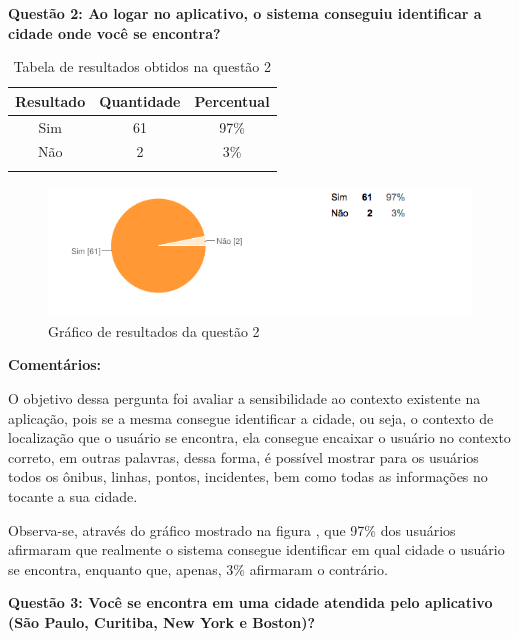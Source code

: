 \textbf{Questão 2: Ao logar no aplicativo, o sistema conseguiu identificar a cidade onde você se encontra?}

\begin{center}
\begin{longtable}{c|c|c}
\hline
    \multicolumn{1}{c}{\textbf{Resultado}} & \multicolumn{1}{c}{\textbf{Quantidade}} & \multicolumn{1}{c}{\textbf{Percentual}} \\
\hline
    Sim & 61 &  97\%\\
    \hline
    Não & 2 & 3\%\\
    \hline
\caption{Tabela de resultados obtidos na questão 2}
\end{longtable}
\end{center}


\begin{figure}[h]
\begin{center}
  \includegraphics[width=16cm]{images/graficos/questao2.png}
  \caption{Gráfico de resultados da questão 2}
  \label{fig:questao1}
\end{center}
\end{figure}

\textbf{Comentários:}

O objetivo dessa pergunta foi avaliar a sensibilidade ao contexto existente na aplicação, pois se a mesma consegue identificar a cidade, ou seja, o contexto de localização que o usuário se encontra, ela consegue encaixar o usuário no contexto correto, em outras palavras, dessa forma, é possível mostrar para os usuários todos os ônibus, linhas, pontos, incidentes, bem como todas as informações no tocante a sua cidade.
	
Observa-se, através do gráfico mostrado na figura , que 97\% dos usuários afirmaram que realmente o sistema consegue identificar em qual cidade o usuário se encontra, enquanto que, apenas, 3\% afirmaram o contrário. \newline

\textbf{Questão 3:  Você se encontra em uma cidade atendida pelo aplicativo (São Paulo, Curitiba, New York e Boston)?}

